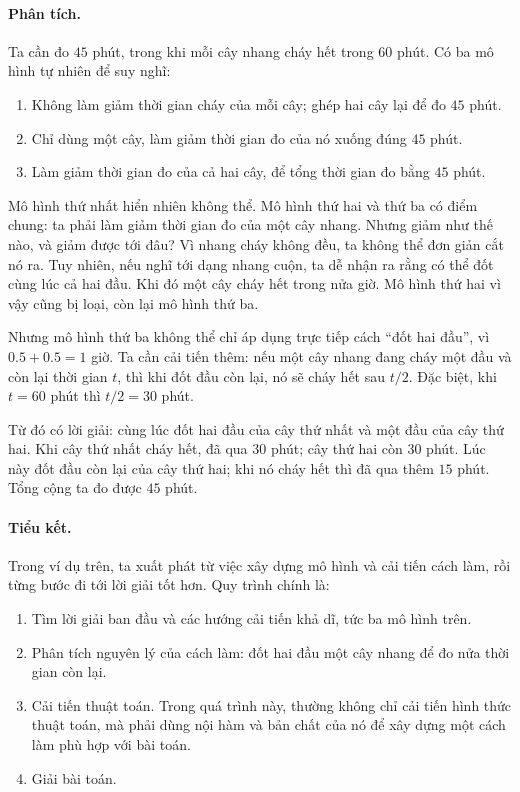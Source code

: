 \documentclass[11pt]{article}
\begin{document}
\paragraph{Phân tích.}
Ta cần đo $45$ phút, trong khi mỗi cây nhang cháy hết trong $60$ phút. Có ba
mô hình tự nhiên để suy nghĩ:
\begin{enumerate}
  \item Không làm giảm thời gian cháy của mỗi cây; ghép hai cây lại để đo
  $45$ phút.
  \item Chỉ dùng một cây, làm giảm thời gian đo của nó xuống đúng $45$ phút.
  \item Làm giảm thời gian đo của cả hai cây, để tổng thời gian đo bằng
  $45$ phút.
\end{enumerate}

Mô hình thứ nhất hiển nhiên không thể. Mô hình thứ hai và thứ ba có điểm
chung: ta phải làm giảm thời gian đo của một cây nhang. Nhưng giảm như thế
nào, và giảm được tới đâu? Vì nhang cháy không đều, ta không thể đơn giản cắt
nó ra. Tuy nhiên, nếu nghĩ tới dạng nhang cuộn, ta dễ nhận ra rằng có thể đốt
cùng lúc cả hai đầu. Khi đó một cây cháy hết trong nửa giờ. Mô hình thứ hai
vì vậy cũng bị loại, còn lại mô hình thứ ba.

Nhưng mô hình thứ ba không thể chỉ áp dụng trực tiếp cách ``đốt hai đầu'',
vì $0.5+0.5=1$ giờ. Ta cần cải tiến thêm: nếu một cây nhang đang cháy một đầu
và còn lại thời gian $t$, thì khi đốt đầu còn lại, nó sẽ cháy hết sau
$t/2$. Đặc biệt, khi $t=60$ phút thì $t/2=30$ phút.

Từ đó có lời giải: cùng lúc đốt hai đầu của cây thứ nhất và một đầu của cây
thứ hai. Khi cây thứ nhất cháy hết, đã qua $30$ phút; cây thứ hai còn
$30$ phút. Lúc này đốt đầu còn lại của cây thứ hai; khi nó cháy hết thì đã qua
thêm $15$ phút. Tổng cộng ta đo được $45$ phút.

\paragraph{Tiểu kết.}
Trong ví dụ trên, ta xuất phát từ việc xây dựng mô hình và cải tiến cách làm,
rồi từng bước đi tới lời giải tốt hơn. Quy trình chính là:
\begin{enumerate}
  \item Tìm lời giải ban đầu và các hướng cải tiến khả dĩ, tức ba mô hình
  trên.
  \item Phân tích nguyên lý của cách làm: đốt hai đầu một cây nhang để đo
  nửa thời gian còn lại.
  \item Cải tiến thuật toán. Trong quá trình này, thường không chỉ cải tiến
  hình thức thuật toán, mà phải dùng nội hàm và bản chất của nó để xây dựng
  một cách làm phù hợp với bài toán.
  \item Giải bài toán.
\end{enumerate}
\end{document}
